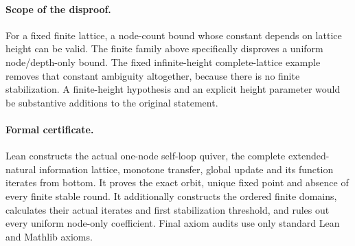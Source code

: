 \documentclass[11pt]{article}
\begin{document}
\paragraph{Scope of the disproof.}
For a fixed finite lattice, a node-count bound whose constant
depends on lattice height can be valid. The finite family above
specifically disproves a uniform node/depth-only bound. The fixed
infinite-height complete-lattice example removes that constant
ambiguity altogether, because there is no finite stabilization.
A finite-height hypothesis and an explicit height parameter would
be substantive additions to the original statement.

\paragraph{Formal certificate.}
Lean constructs the actual one-node self-loop quiver, the complete
extended-natural information lattice, monotone transfer, global
update and its function iterates from bottom. It proves the exact
orbit, unique fixed point and absence of every finite stable round.
It additionally constructs the ordered finite domains, calculates
their actual iterates and first stabilization threshold, and rules
out every uniform node-only coefficient. Final axiom audits use
only standard Lean and Mathlib axioms.
\end{document}

